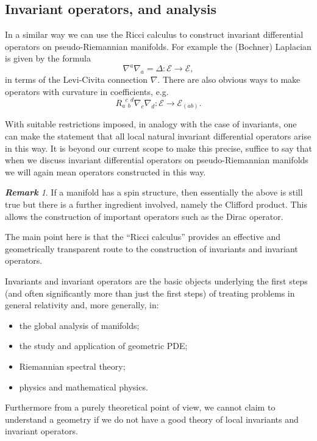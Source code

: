 \documentclass[a4paper,12pt]{amsart}
\theoremstyle{remark}
\newtheorem{remark}[theorem]{\rm\bf Remark}
\begin{document}
\subsection{Invariant operators, and analysis} \label{iops} 
In a similar way we can use the Ricci calculus to construct invariant
differential operators on pseudo-Riemannian manifolds. For example the 
 (Bochner) Laplacian is given by the formula
\begin{equation}\nonumber
\nabla^a\nabla_a=\Delta: \mathcal{E}\longrightarrow\mathcal{E},
\end{equation}
in terms of the Levi-Civita connection $\nabla$.
 There are also obvious ways to make operators with curvature in coefficients, e.g.
\begin{equation}\nonumber
R_{a\phantom{c}b}^{\phantom{a}c\phantom{b}d}\nabla_c\nabla_d:\mathcal{E}\longrightarrow\mathcal{E}_{(ab)}.
\end{equation}

With suitable restrictions imposed, in analogy with the case of
invariants, one can make the statement that all local natural
invariant differential operators arise in this way. It is beyond our
current scope to make this precise, suffice to say that when we
discuss invariant differential operators on pseudo-Riemannian
manifolds we will again mean operators constructed in this
way.

\begin{remark}
If a manifold has a spin structure, then essentially the above is
still true but there is a further ingredient involved, namely the
Clifford product. This allows the construction of important operators
such as the Dirac operator. 
\end{remark}

The main point here is that the ``Ricci calculus'' provides an
effective and geometrically transparent route to the construction of
invariants and invariant operators. 

Invariants and invariant operators are the basic objects underlying
the first steps (and often significantly more than just the first steps) of
treating problems in general relativity and, more generally, in: 
\begin{itemize}
\item the global analysis of manifolds;
\item the study and application of geometric PDE;
\item Riemannian spectral theory;
\item physics and mathematical physics.
\end{itemize}
Furthermore from a purely theoretical point of view, we cannot claim
to understand a geometry if we do not have a good theory of local
invariants and invariant operators.
\end{document}

